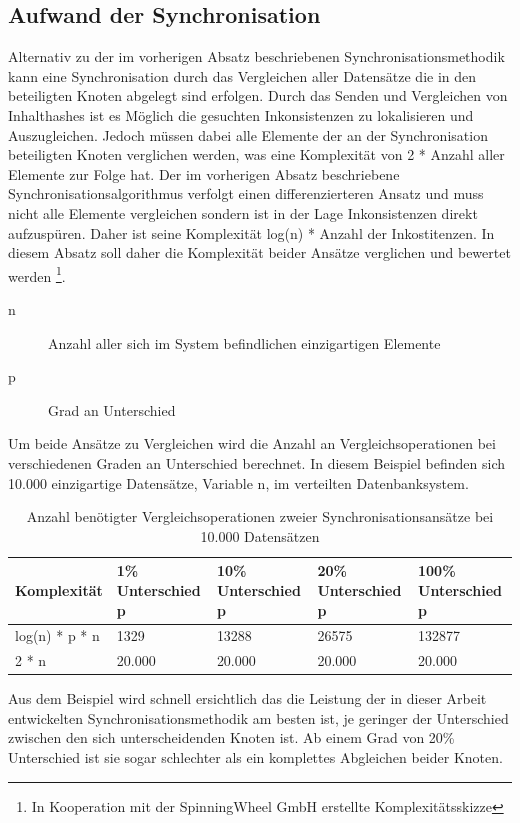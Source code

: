 \documentclass[a4paper,11pt,oneside,%
headsepline,												%
footsepline,												%
bibtotocnumbered									%
]{scrreprt}
\begin{document}
\subsection{Aufwand der Synchronisation}
Alternativ zu der im vorherigen Absatz beschriebenen Synchronisationsmethodik kann eine Synchronisation durch das Vergleichen aller Datensätze die in den beteiligten Knoten abgelegt sind erfolgen. Durch das Senden und Vergleichen von Inhalthashes ist es Möglich die gesuchten Inkonsistenzen zu lokalisieren und Auszugleichen. Jedoch müssen dabei alle Elemente der an der Synchronisation beteiligten Knoten verglichen werden, was eine Komplexität von 2 * Anzahl aller Elemente zur Folge hat. Der im vorherigen Absatz beschriebene Synchronisationsalgorithmus verfolgt einen differenzierteren Ansatz und muss nicht alle Elemente vergleichen sondern ist in der Lage Inkonsistenzen direkt aufzuspüren. Daher ist seine Komplexität log(n) *  Anzahl der Inkostitenzen. In diesem Absatz soll daher die Komplexität beider Ansätze verglichen und bewertet werden \footnote{In Kooperation mit der SpinningWheel GmbH erstellte Komplexitätsskizze}.
\begin{description}
   \item[n ] Anzahl aller sich im System befindlichen einzigartigen Elemente
   \item[p] Grad an Unterschied 
\end{description}

Um beide Ansätze zu Vergleichen wird die Anzahl an Vergleichsoperationen bei verschiedenen Graden an Unterschied berechnet. In diesem Beispiel befinden sich 10.000 einzigartige Datensätze, Variable n, im verteilten Datenbanksystem.

\begin{table}[h!]
\centering
    \begin{tabular}{| l | l | l | l | l |}
    \hline
    Komplexität & 1\% Unterschied p & 10\% Unterschied p & 20\% Unterschied p & 100\% Unterschied p\\ \hline
    log(n) * p * n & 1329 & 13288 & 26575 & 132877 \\ \hline
    2 * n & 20.000 & 20.000 & 20.000 & 20.000\\ \hline
    \end{tabular}
\caption{Anzahl benötigter Vergleichsoperationen zweier Synchronisationsansätze bei 10.000 Datensätzen}
\label{table:1}
\end{table}

Aus dem Beispiel wird schnell ersichtlich das die Leistung der in dieser Arbeit entwickelten Synchronisationsmethodik am besten ist, je geringer der Unterschied zwischen den sich unterscheidenden Knoten ist. Ab einem Grad von 20\% Unterschied ist sie sogar schlechter als ein komplettes Abgleichen beider Knoten.
	
\end{document}
